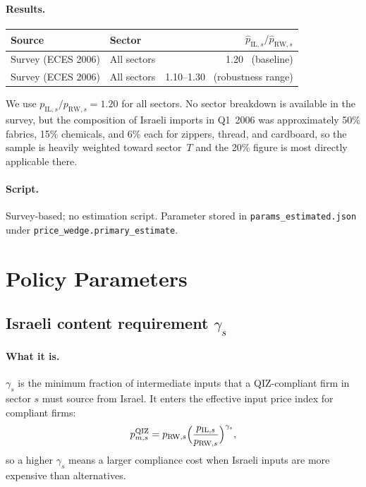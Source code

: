 \documentclass[12pt]{article}
\begin{document}
\paragraph{Results.}
\begin{center}
\begin{tabular}{llr}
\toprule
Source & Sector & $\hat p_{\mathrm{IL},s}/\hat p_{\mathrm{RW},s}$ \\
\midrule
Survey (ECES 2006) & All sectors & 1.20 \ (baseline) \\
Survey (ECES 2006) & All sectors & 1.10--1.30 \ (robustness range) \\
\bottomrule
\end{tabular}
\end{center}

\noindent We use $p_{\mathrm{IL},s}/p_{\mathrm{RW},s} = 1.20$ for all
sectors. No sector breakdown is available in the survey, but the composition
of Israeli imports in Q1~2006 was approximately 50\% fabrics, 15\%
chemicals, and 6\% each for zippers, thread, and cardboard, so the sample
is heavily weighted toward sector~$T$ and the 20\% figure is most directly
applicable there.

\paragraph{Script.} Survey-based; no estimation script.
Parameter stored in \texttt{params\_estimated.json} under
\texttt{price\_wedge.primary\_estimate}.

\section{Policy Parameters}

\subsection{Israeli content requirement $\gamma_s$}

\paragraph{What it is.}
$\gamma_s$ is the minimum fraction of intermediate inputs that a QIZ-compliant
firm in sector $s$ must source from Israel. It enters the effective input
price index for compliant firms:
\[
p_{m,s}^{\mathrm{QIZ}} = p_{\mathrm{RW},s}
  \Bigl(\frac{p_{\mathrm{IL},s}}{p_{\mathrm{RW},s}}\Bigr)^{\gamma_s},
\]
so a higher $\gamma_s$ means a larger compliance cost when Israeli inputs
are more expensive than alternatives.
\end{document}
